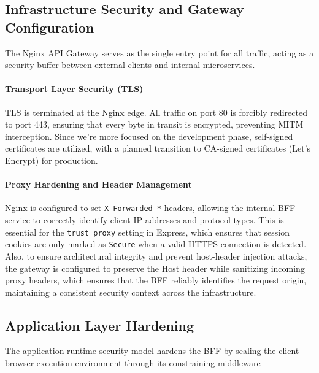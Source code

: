 \subsection{Infrastructure Security and Gateway Configuration}

The Nginx API Gateway serves as the single entry point for all traffic, acting as a security buffer between external clients and internal microservices.

\paragraph{Transport Layer Security (TLS)}
TLS is terminated at the Nginx edge. All traffic on port 80 is forcibly redirected to port 443, 
ensuring that every byte in transit is encrypted, preventing \ac{MITM} interception.
Since we’re more focused on the development phase, self-signed certificates are utilized, with a planned transition to CA-signed certificates (Let’s Encrypt) for production.

\paragraph{Proxy Hardening and Header Management}
Nginx is configured to set \newline \texttt{X-Forwarded-*} headers, allowing the internal BFF service to correctly identify client IP addresses and protocol types. 
This is essential for the \texttt{trust proxy} setting in Express, which ensures that session cookies are only marked as \texttt{Secure} when a valid HTTPS connection is detected.
Also, to ensure architectural integrity and prevent host-header injection attacks, the gateway is configured to preserve the Host header while sanitizing incoming proxy headers, which ensures that the BFF reliably identifies the request origin, maintaining a consistent security context across the infrastructure.

\subsection{Application Layer Hardening}

The application runtime security model hardens the \ac{BFF} by sealing the client-browser execution environment through its constraining middleware

